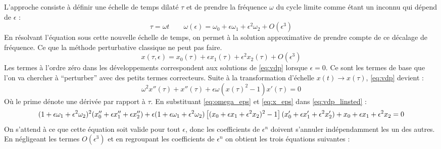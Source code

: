 L'approche consiste à définir une échelle de temps dilaté $\tau$ et de prendre la fréquence $\omega$ du cycle limite comme étant un inconnu qui dépend de $\epsilon$ :
\begin{equation}
    \tau = \omega t
    \qquad
    \omega(\epsilon) = \omega_0 + \epsilon\omega_1 + \epsilon^2\omega_2 + O(\epsilon^3)
    \label{eq:omega_eps}
\end{equation}
%
En résolvant l'équation sous cette nouvelle échelle de temps, on permet à la solution approximative de prendre compte de ce décalage de fréquence.
Ce que la méthode perturbative classique ne peut pas faire.
\begin{equation}
    x(\tau, \epsilon) = x_0(\tau) + \epsilon x_1(\tau) + \epsilon^2 x_2(\tau) + O(\epsilon^3)
    \label{eq:x_eps}
\end{equation}
%
Les termes à l’ordre zéro dans les développements correspondent aux solutions de \eqref{eq:vdp} lorsque $\epsilon = 0$.
Ce sont les termes de base que l’on va chercher à ``perturber” avec des petits termes correcteurs.
%
Suite à la transformation d'échelle $x(t) \to x(\tau)$, \eqref{eq:vdp} devient :
%
\begin{equation}
    \omega^2x''(\tau) + x''(\tau) + \epsilon\omega \left( x(\tau)^2 - 1 \right)x'(\tau) = 0
    \label{eq:vdp_linsted}
\end{equation}
%
Où le prime dénote une dérivée par rapport à $\tau$. En substituant \eqref{eq:omega_eps} et \eqref{eq:x_eps} dans \eqref{eq:vdp_linsted} :
%
\begin{dmath}
    (1+\epsilon\omega_1 + \epsilon^2\omega_2)^2(x_0'' + \epsilon x_1'' + \epsilon x_2'') + \epsilon(1+\epsilon\omega_1 + \epsilon^2\omega_2)\left[(x_0 + \epsilon x_1 + \epsilon^2 x_2)^2-1\right](x_0' + \epsilon x_1' + \epsilon^2 x_2') \\
    + {x_0 + \epsilon x_1 + \epsilon^2 x_2} = 0
\end{dmath}
%
On s’attend à ce que cette  équation soit valide pour tout $\epsilon$, donc les coefficients de $\epsilon^n$ doivent s’annuler indépendamment les un des autres. 
En négligeant les termes $O(\epsilon^3)$ et en regroupant les coefficients de $\epsilon^n$ on obtient les trois équations suivantes :
